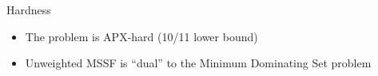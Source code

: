 \begin{frame}{Hardness}
\begin{itemize}
  \item<1> The problem is APX-hard (10/11 lower bound)
  \item<2> Unweighted MSSF is ``dual'' to the Minimum Dominating Set problem
\end{itemize}

\vfill

\centering


\end{frame}
